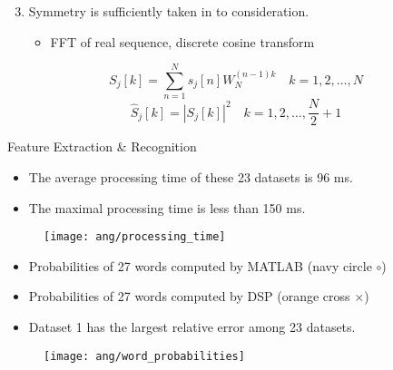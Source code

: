 \begin{frame}
\begin{enumerate}
	\setcounter{enumi}{2}
	\item Symmetry is sufficiently taken in to consideration.
	\begin{itemize}
		\item FFT of real sequence, discrete cosine transform
	\end{itemize}
\end{enumerate}

\begin{equation}
S_j[k] = \sum_{n=1}^{N} s_j[n] W_N^{(n-1) k} \quad k = 1, 2, \dots, N
\end{equation}
\begin{equation}
\hat{S}_j[k] = |S_j[k]|^2 \quad k = 1, 2, \dots, \frac{N}{2} + 1
\end{equation}
\end{frame}


\begin{frame}
Feature Extraction \& Recognition
\begin{itemize}
\item The average processing time of these 23 datasets is 96 ms.
\item The maximal processing time is less than 150 ms.
\end{itemize}

\begin{figure}[H]
\centering
\texttt{[image: ang/processing\_time]}
\end{figure}
\end{frame}


\begin{frame}
\begin{itemize}
\item Probabilities of 27 words computed by MATLAB (\textcolor{navy_matlab}{navy circle $\circ$})
\item Probabilities of 27 words computed by DSP (\textcolor{orange_matlab}{orange cross $\times$})
\item Dataset 1 has the largest relative error among 23 datasets.
\end{itemize}

\begin{figure}[H]
\centering
\texttt{[image: ang/word\_probabilities]}
\end{figure}
\end{frame}

